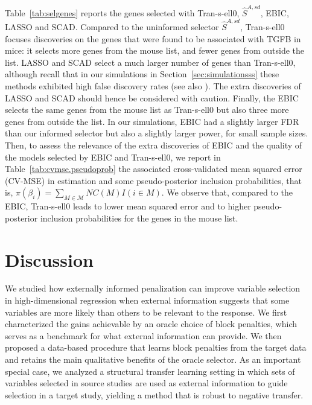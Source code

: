 \documentclass[
  12pt]{article}
\newcommand{\david}[1]{{\small{\color{blue} \sf $\heartsuit$ [David: #1]}}}
\newcommand{\M}{\mathcal{M}}
\begin{document}
Table~\ref{tab:selgenes} reports the genes selected with Tran-s-ell0, $\hat S^{A,sd}$, EBIC, LASSO and SCAD. Compared to the uninformed selector $\hat{S}^{A,sd}$, Tran-s-ell0 focuses discoveries on the genes that were found to be associated with TGFB in mice: it selects more genes from the mouse list, and fewer genes from outside the list. LASSO and SCAD select a much larger number of genes than Tran-s-ell0, although recall that in our simulations in Section~\ref{sec:simulationsss} these methods exhibited high  false discovery rates (see also \cite{slope}). The extra discoveries of LASSO and SCAD should hence be considered with caution. Finally, the EBIC selects the same genes from the mouse list as Tran-s-ell0 but also three more genes from outside the list. In our simulations, EBIC had a slightly larger FDR than our informed selector but also a slightly larger power, for small sample sizes. Then, to assess the relevance of the extra discoveries of EBIC and the quality of the models selected by EBIC and Tran-s-ell0, we report in Table~\ref{tab:cvmse.pseudoprob} the associated cross-validated mean squared error (CV-MSE) in estimation and some pseudo-posterior inclusion probabilities, that is, $\pi(\beta_i)=\sum_{M\in\M} NC(M)I(i\in M)$. We observe that, compared to the EBIC, Tran-s-ell0 leads to lower mean squared error and to higher pseudo-posterior inclusion probabilities for the genes in the mouse list. %


\section{Discussion}
We studied how externally informed penalization can improve variable selection in high-dimensional regression when external information suggests that some variables are more likely than others to be relevant to the response. 
We first characterized the gains achievable by an oracle choice of block penalties, which serves as a benchmark for what external information can provide. 
We then proposed a data-based procedure that learns block penalties from the target data and retains the main qualitative benefits of the oracle selector. 
As an important special case, we analyzed a structural transfer learning setting in which sets of variables selected in source studies are used as external information to guide selection in a target study, yielding a method that is robust to negative transfer.
\end{document}
